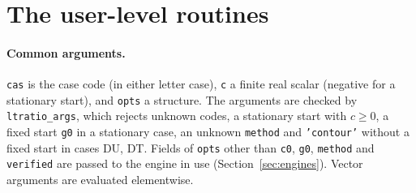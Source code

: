 \documentclass[11pt]{article}
\newcommand{\code}[1]{\texttt{#1}}
\newcommand{\Fu}{\textsf{DU}}
\newcommand{\Ft}{\textsf{DT}}
\begin{document}
\section{The user-level routines}
\label{sec:user}

\paragraph{Common arguments.}  \code{cas} is the case code (in either letter case), \code{c} a finite real scalar (negative for a stationary start), and \code{opts} a structure.  The arguments are checked by \code{ltratio\_args}, which rejects unknown codes, a stationary start with $c\ge0$, a fixed start \code{g0} in a stationary case, an unknown \code{method} and \code{'contour'} without a fixed start in cases \Fu, \Ft.  Fields of \code{opts} other than \code{c0}, \code{g0}, \code{method} and \code{verified} are passed to the engine in use (Section~\ref{sec:engines}).  Vector arguments are evaluated elementwise.
\end{document}
